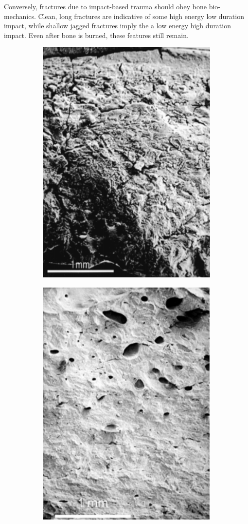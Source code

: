 \documentclass[titlepage]{article}
\begin{document}
Conversely, fractures due to impact-based trauma should obey bone bio-mechanics. Clean, long fractures are indicative of some high energy low duration impact, while shallow jagged fractures imply the a low energy high duration impact. Even after bone is burned, these features still remain.

\begin{figure}[h!]
\centering
\begin{subfigure}{.5\textwidth}
  \centering
  \includegraphics[width=.7\linewidth]{trauma_transverse}
  \end{subfigure}%
\begin{subfigure}{.5\textwidth}
  \centering
  \includegraphics[width=.7\linewidth]{heat_transverse}

\end{subfigure}
\end{figure}
\end{document}
